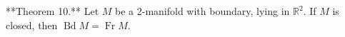 **Theorem 10.** Let $M$ be a 2-manifold with boundary, lying in $\mathbb{R}^2$. If $M$ is closed, then $\operatorname{Bd} M = \operatorname{Fr} M$.
